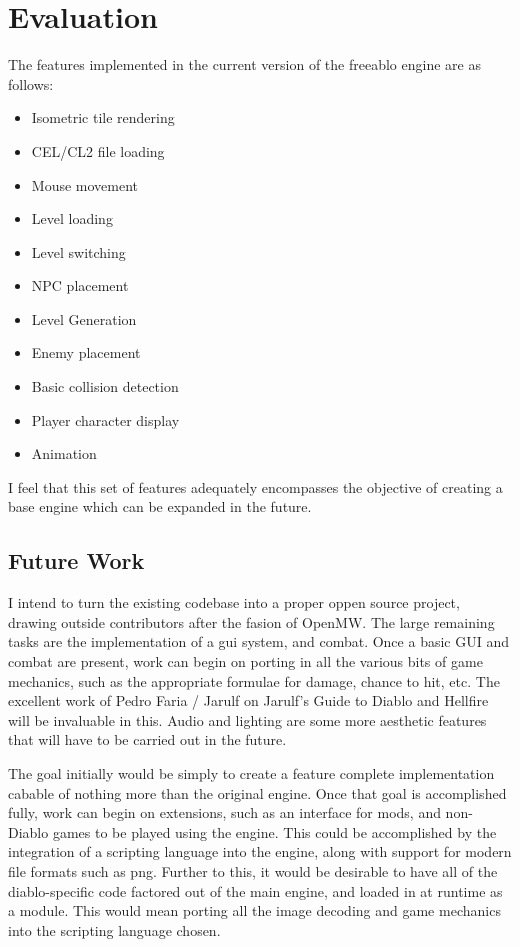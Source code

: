 \section{Evaluation}
	The features implemented in the current version of the freeablo engine are as follows:\\
	\begin{itemize}
		\item{Isometric tile rendering}
		\item{CEL/CL2 file loading}
		\item{Mouse movement}
		\item{Level loading}
		\item{Level switching}
		\item{NPC placement}
		\item{Level Generation}
		\item{Enemy placement}
		\item{Basic collision detection}
		\item{Player character display}
		\item{Animation}
	\end{itemize}
	
	I feel that this set of features adequately encompasses the objective of creating a base engine which can be expanded in the future.
	
	\subsection{Future Work}
	I intend to turn the existing codebase into a proper oppen source project, drawing outside contributors after the fasion of OpenMW\cite{openmw}. The large remaining tasks are the implementation of a gui system, and combat.
	Once a basic GUI and combat are present, work can begin on porting in all the various bits of game mechanics, such as the appropriate formulae for damage, chance to hit, etc. The excellent work of Pedro Faria / Jarulf on Jarulf's Guide to Diablo and Hellfire\cite{jarulf} will be invaluable in this.
	Audio and lighting are some more aesthetic features that will have to be carried out in the future. 
	
	The goal initially would be simply to create a feature complete implementation cabable of nothing more than the original engine. Once that goal is accomplished fully, work can begin on extensions, such as an interface for mods, and non-Diablo games to be played using the engine.
	This could be accomplished by the integration of a scripting language into the engine, along with support for modern file formats such as png. 
	Further to this, it would be desirable to have all of the diablo-specific code factored out of the main engine, and loaded in at runtime as a module. This would mean porting all the image decoding and game mechanics into the scripting language chosen.
	
